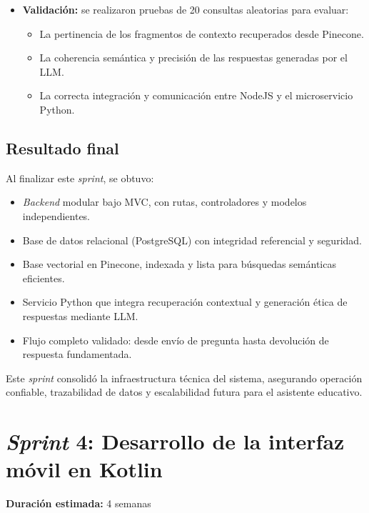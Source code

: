 \begin{enumerate}
\begin{itemize}
                  \item \textbf{Validación:} se realizaron pruebas de 20 consultas aleatorias para evaluar:
                        \begin{itemize}
                              \item La pertinencia de los fragmentos de contexto recuperados desde Pinecone.
                              \item La coherencia semántica y precisión de las respuestas generadas por el LLM.
                              \item La correcta integración y comunicación entre NodeJS y el microservicio Python.
                        \end{itemize}
            \end{itemize}
\end{enumerate}

\subsection{Resultado final}
Al finalizar este \textit{sprint}, se obtuvo:

\begin{itemize}
      \item \textit{Backend} modular bajo MVC, con rutas, controladores y modelos independientes.
      \item Base de datos relacional (PostgreSQL) con integridad referencial y seguridad.
      \item Base vectorial en Pinecone, indexada y lista para búsquedas semánticas
            eficientes.
      \item Servicio Python que integra recuperación contextual y generación ética de
            respuestas mediante LLM.
      \item Flujo completo validado: desde envío de pregunta hasta devolución de respuesta
            fundamentada.
\end{itemize}

Este \textit{sprint} consolidó la infraestructura técnica del sistema,
asegurando operación confiable, trazabilidad de datos y escalabilidad futura
para el asistente educativo.

\section{\textit{Sprint} 4: Desarrollo de la interfaz móvil en Kotlin}
\textbf{Duración estimada:} 4 semanas

